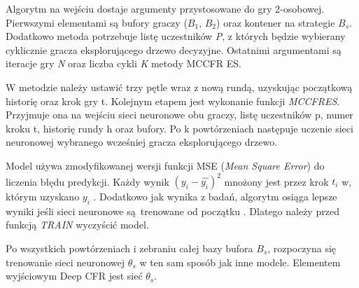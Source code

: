 \documentclass[12pt,oneside,a4paper]{report}
\begin{document}
\vspace{1cm}
Algorytm na wejściu dostaje argumenty przystosowane do gry 2-osobowej.
Pierwszymi elementami są bufory graczy ($B_{1}$, $B_{2}$) oraz kontener na 
strategie $B_{s}$.
Dodatkowo metoda potrzebuje listę uczestników \emph{P}, z których będzie wybierany cyklicznie gracza
eksplorującego drzewo decyzyjne.
Ostatnimi argumentami są iteracje gry \emph{N} oraz liczba cykli \emph{K} metody MCCFR ES.


W metodzie należy ustawić trzy pętle wraz z nową rundą, uzyskując początkową historię oraz
krok gry t. Kolejnym etapem jest
wykonanie funkcji \emph{MCCFRES}. Przyjmuje ona na wejściu sieci neuronowe obu graczy, 
listę uczestników p,
numer kroku t, historię rundy h oraz bufory. Po k 
powtórzeniach następuje uczenie sieci neuronowej wybranego wcześniej gracza eksplorującego drzewo. 

Model używa 
zmodyfikowanej wersji funkcji MSE (\emph{Mean Square Error}) do liczenia błędu predykcji. Każdy wynik $(y_{i} - \hat{y_{i}})^2$
mnożony jest przez krok $t_{i}$ w, którym uzyskano $y_{i}$ \cite{DCFR}.
Dodatkowo jak wynika z badań, algorytm osiąga lepsze wyniki
jeśli
sieci neuronowe są trenowane od początku \cite{DCFR}. Dlatego należy przed funkcją \emph{TRAIN}
wyczyścić model.

Po wszystkich powtórzeniach i zebraniu całej bazy bufora $B_{s}$, rozpoczyna się trenowanie sieci 
neuronowej $\theta_{s}$ w ten sam sposób jak inne modele. Elementem wyjściowym Deep CFR jest sieć 
$\theta_{s}$.
\end{document}
